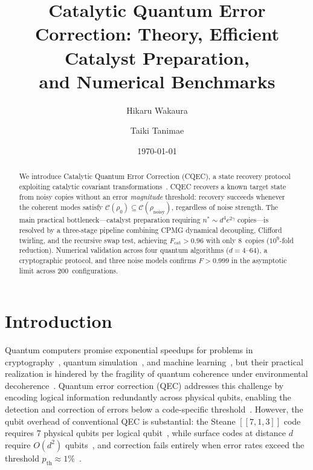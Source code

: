 \documentclass[prx,twocolumn,superscriptaddress,longbibliography,floatfix]{revtex4-2}
\begin{document}
\title{Catalytic Quantum Error Correction: Theory, Efficient Catalyst Preparation,\\and Numerical Benchmarks}

\author{Hikaru Wakaura}

\author{Taiki Tanimae}
\date{\today}

\begin{abstract}
We introduce Catalytic Quantum Error Correction (CQEC), a state recovery protocol exploiting catalytic covariant transformations~\cite{Shiraishi2024}.
CQEC recovers a known target state from noisy copies without an error \emph{magnitude} threshold: recovery succeeds whenever the coherent modes satisfy $\mathcal{C}(\rho_0) \subseteq \mathcal{C}(\rho_\mathrm{noisy})$, regardless of noise strength.
The main practical bottleneck---catalyst preparation requiring $n^* \sim d^4 e^{2\gamma}$ copies---is resolved by a three-stage pipeline combining CPMG dynamical decoupling, Clifford twirling, and the recursive swap test, achieving $F_\mathrm{cat} > 0.96$ with only 8~copies ($10^9$-fold reduction).
Numerical validation across four quantum algorithms ($d = 4$--$64$), a cryptographic protocol, and three noise models confirms $F > 0.999$ in the asymptotic limit across 200~configurations.
\end{abstract}

\maketitle


\section{Introduction}
\label{sec:introduction}

Quantum computers promise exponential speedups for problems in cryptography~\cite{Regev2024,Shor1997}, quantum simulation~\cite{Campbell2019,Feynman1982}, and machine learning~\cite{Ivashkov2024,Biamonte2017}, but their practical realization is hindered by the fragility of quantum coherence under environmental decoherence~\cite{Zurek2003,NielsenChuang2010}.
Quantum error correction (QEC) addresses this challenge by encoding logical information redundantly across physical qubits, enabling the detection and correction of errors below a code-specific threshold~\cite{Shor1995,Gottesman1997}.
However, the qubit overhead of conventional QEC is substantial: the Steane $[\![7,1,3]\!]$ code requires 7 physical qubits per logical qubit~\cite{Steane1996}, while surface codes at distance $d$ require $O(d^2)$ qubits~\cite{Kitaev2003,Fowler2012}, and correction fails entirely when error rates exceed the threshold $p_\mathrm{th} \approx 1\%$~\cite{Knill2005}.
\end{document}
